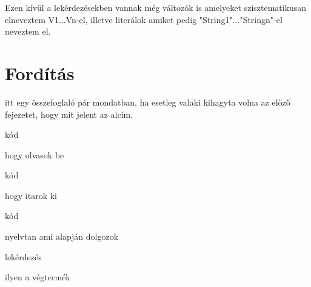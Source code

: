 Ezen kívül a lekérdezésekben vannak még változók is amelyeket szisztematikusan elneveztem V1...Vn-el, illetve literálok amiket pedig "String1"..."Stringn"-el neveztem el. 










\section{Fordítás}
itt egy összefoglaló pár mondatban, ha esetleg valaki kihagyta volna az előző fejezetet, hogy mit jelent az alcím.

kód

hogy olvasok be

kód

hogy itarok ki

kód

nyelvtan ami alapján dolgozok

lekérdezés

ilyen a végtermék

